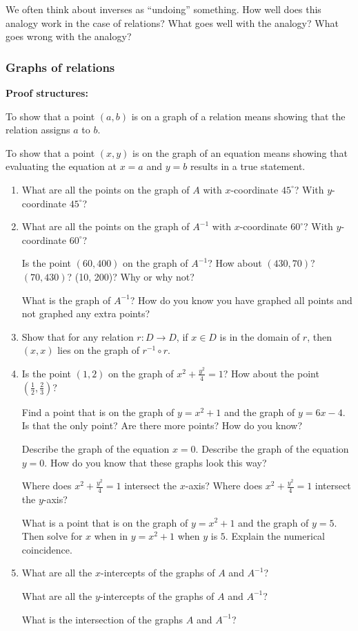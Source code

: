 \documentclass[11pt]{article}
\newcommand{\handout}{\subsubsection}
\newcommand\degrees{^\circ}
\theoremstyle{definition}
\begin{document}
\vfill 

We often think about inverses as ``undoing'' something. How well does this analogy work in the case of relations? What goes well with the analogy? What goes wrong with the analogy?

\vfill 
\newpage
\handout{Graphs of relations}

\begin{mdframed}
{\bf Proof structures:}

To show that a point $(a, b)$ is on a graph of a relation means showing that the relation assigns $a$ to $b$.

To show that a point $(x, y)$ is on the graph of an equation means showing that evaluating the equation at $x=a$ and $y=b$ results in a true statement.
\end{mdframed}

\vfill 
\begin{enumerate}
\item What are all the points on the graph of $A$ with $x$-coordinate $45\degrees$? With $y$-coordinate $45\degrees$?

\vfill 
\item What are all the points on the graph of $A^{-1}$ with $x$-coordinate $60\degrees$? With $y$-coordinate $60\degrees$?
 
Is the point $(60, 400)$ on the graph of $A^{-1}$? How about $(430, 70)$? $(70, 430)$? (10, 200)? Why or why not?
  
What is the graph of $A^{-1}$? How do you know you have graphed all points and not graphed any extra points?

\vfill
\item Show that for any relation $r:D\to D$, if $x\in D$ is in the domain of $r$, then $(x,x)$ lies on the graph of $r^{-1}\circ r$. 

\vfill

\item Is the point $(1,2)$ on the graph of $x^2+\frac{y^2}{4}=1$?  How about the point $(\frac{1}{2},\frac{2}{3})$? 

Find a point that is on the graph of $y=x^2+1$ and the graph of $y=6x-4$. Is that the only point? Are there more points? How do you know?

Describe the graph of the equation $x=0$. Describe the graph of the equation $y=0$. How do you know that these graphs look this way?

Where does $x^2+\frac{y^2}{4}=1$ intersect the $x$-axis? Where does $x^2+\frac{y^2}{4}=1$ intersect the $y$-axis?

What is a point that is on the graph of $y=x^2+1$ and the graph of $y=5$. Then solve for $x$ when in $y=x^2+1$ when $y$ is $5$. Explain the numerical coincidence.
\vfill 

\item What are all the $x$-intercepts of the graphs of $A$ and $A^{-1}$?

What are all the $y$-intercepts of the graphs of $A$ and $A^{-1}$?

What is the intersection of the graphs $A$ and $A^{-1}$?
\end{enumerate}
\vfill
\end{document}
